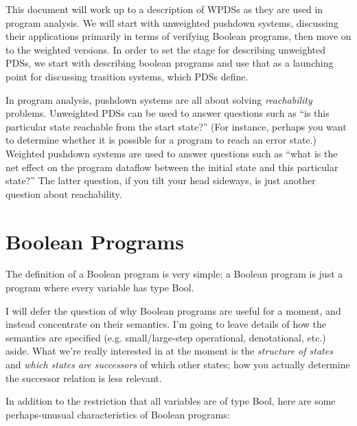 \documentclass{article}
\begin{document}
This document will work up to a description of WPDSs as they are used
in program analysis. We will start with unweighted pushdown systems,
discussing their applications primarily in terms of verifying Boolean
programs, then move on to the weighted versions. In order to set the
stage for describing unweighted PDSs, we start with describing boolean
programs and use that as a launching point for discussing trasition
systems, which PDSs define.

In program analysis, pushdown systems are all about solving
\emph{reachability} problems. Unweighted PDSs can be used to answer
questions such as ``is this particular state reachable from the start
state?'' (For instance, perhaps you want to determine whether it is
possible for a program to reach an error state.) Weighted pushdown
systems are used to answer questions such as ``what is the net effect
on the program dataflow between the initial state and this particular
state?'' The latter question, if you tilt your head sideways, is just
another question about reachability.


\section{Boolean Programs}
The definition of a Boolean program is very simple: a Boolean program
is just a program where every variable has type Bool.

I will defer the question of why Boolean programs are useful for a
moment, and instead concentrate on their semantics. I'm going to leave
details of how the semantics are specified (e.g. small/large-step
operational, denotational, etc.) aside. What we're really interested
in at the moment is the \emph{structure of states} and \emph{which
  states are successors} of which other states; how you actually
determine the successor relation is less relevant.

In addition to the restriction that all variables are of type Bool,
here are some perhaps-unusual characteristics of Boolean programs:
\end{document}
